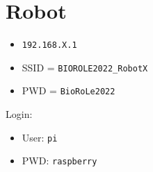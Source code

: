 \documentclass[
    fontsize      = 11pt,
    paper         = a4,
    twoside       = false,
    parskip       = half,
    pagesize      = false,
]{scrartcl}
\providecommand{\tightlist}{%
  \setlength{\itemsep}{0pt}\setlength{\parskip}{0pt}}
\begin{document}
\clearpage
\newpage

\hypertarget{robot}{%
\section{Robot}\label{robot}}

\begin{itemize}
\tightlist
\item
  \texttt{192.168.X.1}
\item
  SSID = \texttt{BIOROLE2022\_RobotX}
\item
  PWD = \texttt{BioRoLe2022}
\end{itemize}

Login:

\begin{itemize}
\tightlist
\item
  User: \texttt{pi}
\item
  PWD: \texttt{raspberry}
\end{itemize}

\clearpage
\newpage
\end{document}
